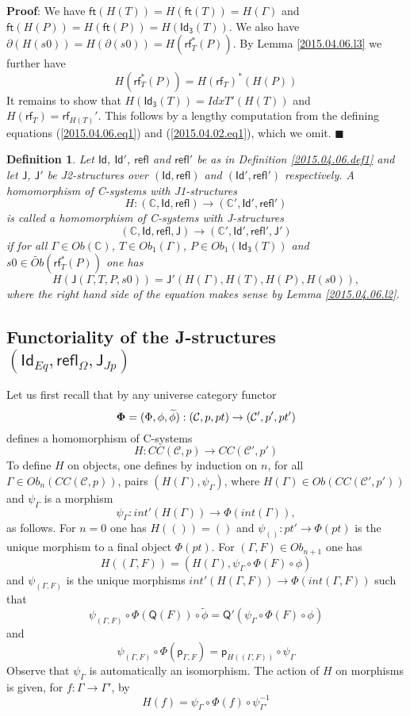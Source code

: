 \documentclass[12pt]{article}
\numberwithin{equation}{section}
\newenvironment{myproof}{{\bf Proof}:}{$\blacksquare$ \vskip 5mm }
\newtheorem{definition}[proposition]{Definition}
\newcommand{\sr}{\rightarrow}
\newcommand{\wt}{\widetilde}
\newcommand{\toCC}{CC} %
\newcommand{\CC}{{\mathbb C}}  %
\newcommand{\C}{{\mathcal C}}  %
\newcommand{\ft}{\mathsf{ft}}
\newcommand{\p}{\mathsf{p}}
\newcommand{\Id}{\mathsf{Id}} %
\newcommand{\Idx}{\mathsf{Id_3}} %
\newcommand{\refl}{\mathsf{refl}}
\newcommand{\J}{\mathsf{J}}
\newcommand{\rf}{\mathsf{rf}}
\newcommand{\Q}{\mathsf{Q}}
\newcommand{\Obwt}{\wt{Ob}}
\begin{document}
%
\begin{myproof}
We have $\ft(H(T))=H(\ft(T))=H(\Gamma)$ and $\ft(H(P))=H(\ft(P))=H(\Idx(T))$. We
also have $\partial(H(s0))=H(\partial(s0))=H(\rf_T^*(P))$. By Lemma
\ref{2015.04.06.l3} we further have
%
$$H(\rf_T^*(P))=H(\rf_T)^*(H(P))$$
%
It remains to show that $H(\Idx(T))=IdxT'(H(T))$ and $H(\rf_T)=\rf_{H(T)}'$. This
follows by a lengthy computation from the defining
equations (\ref{2015.04.06.eq1}) and (\ref{2015.04.02.eq1}), which we omit.
\end{myproof}
%
\begin{definition}
\label{2015.04.06.def2} Let $\Id$, $\Id'$, $\refl$ and $\refl'$ be as in
Definition \ref{2015.04.06.def1} and let $\J$, $\J'$ be J2-structures over
$(\Id,\refl)$ and $(\Id',\refl')$ respectively. A homomorphism of C-systems with
J1-structures
%
$$H:(\CC,\Id,\refl)\sr (\CC',\Id',\refl')$$
%
is called a homomorphism of C-systems with J-structures
%
$$(\CC,\Id,\refl,\J)\sr (\CC',\Id',\refl',\J')$$
%
if for all $\Gamma\in Ob(\CC)$, $T\in Ob_1(\Gamma)$, $P\in Ob_1(\Idx(T))$ and
$s0\in \Obwt(\rf_T^*(P))$ one has
%
$$H(\J(\Gamma,T,P,s0))=\J'(H(\Gamma),H(T),H(P),H(s0)),$$
%
where the right hand side of the equation makes sense by Lemma
\ref{2015.04.06.l2}.
\end{definition}
%











\subsection{Functoriality of the J-structures $(\Id_{Eq},\refl_{\Omega},\J_{Jp})$}
%
\label{2015.04.12.sec1}
%
Let us first recall that by \cite[Construction 3.3]{Cfromauniverse} any
universe category functor $${\bf \Phi}=(\Phi,\phi,\wt{\phi}) : (\C,p,pt) \to (\C',p',pt')$$ defines a
homomorphism of C-systems
%
$$H:\toCC({\C},p)\sr \toCC({\C}',p')$$
%
To define $H$ on objects, one defines by induction on $n$, for all $\Gamma\in
Ob_n(\toCC({\C},p))$, pairs $(H(\Gamma),\psi_{\Gamma})$, where
$H(\Gamma)\in Ob(\toCC({\C}',p'))$ and $\psi_{\Gamma}$ is a morphism
%
$$\psi_{\Gamma}:int'(H(\Gamma))\sr \Phi(int(\Gamma)),$$
%
as follows. For $n=0$ one has $H(())=()$ and $\psi_{()}:pt'\sr \Phi(pt)$ is the
unique morphism to a final object $\Phi(pt)$. For $(\Gamma,F)\in Ob_{n+1}$ one
has
%
$$H((\Gamma,F))=(H(\Gamma),\psi_{\Gamma}\circ\Phi(F)\circ \phi)$$
%
and $\psi_{(\Gamma,F)}$ is the unique morphisms $int'(H(\Gamma,F))\sr
\Phi(int(\Gamma,F))$ such that
%
$$\psi_{(\Gamma,F)}\circ
\Phi(\Q(F))\circ\wt{\phi}=\Q'(\psi_{\Gamma}\circ\Phi(F)\circ\phi)$$
%
and
%
$$\psi_{(\Gamma,F)}\circ \Phi(\p_{\Gamma,F})=\p_{H((\Gamma,F))}\circ
\psi_{\Gamma}$$
%
Observe that $\psi_{\Gamma}$ is automatically an isomorphism. The action of $H$
on morphisms is given, for $f:\Gamma\sr\Gamma'$, by
%
$$H(f)=\psi_{\Gamma}\circ\Phi(f)\circ\psi_{\Gamma'}^{-1}$$
%
\end{document}

